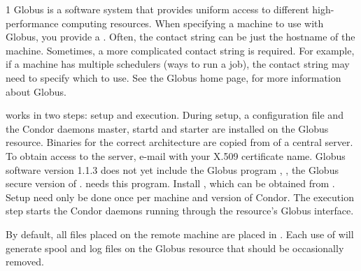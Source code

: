 \begin{ManPage}{\label{man-condor-glidein}}{1}
Globus is a software system that provides uniform access to
different high-performance computing resources.
When specifying a machine to use with Globus,
you provide a .
Often, the contact string can be just the hostname of the machine.
Sometimes, a more complicated contact string is required.
For example, if a machine has multiple schedulers (ways to run a job),
the contact string may need to specify which to use.
See the Globus home page,  for more
information about Globus.

 works in two steps: setup and execution.
During setup, a configuration file and the Condor daemons
master, startd and starter are installed on the Globus
resource.
Binaries for the correct architecture are copied from of a central server.
To obtain access to the server,
e-mail  with your X.509
certificate name.
Globus software version 1.1.3 does not yet include
the Globus program ,
, the Globus secure version of .
 needs this program.
Install , which can be obtained from
.
Setup need only be done once per machine and version of Condor.
The execution step starts the Condor daemons running through
the resource's Globus interface.

By default, all files placed on the remote machine are placed in
.
Each use of  will generate spool and log
files on the Globus resource that should be occasionally removed.


\end{ManPage}
